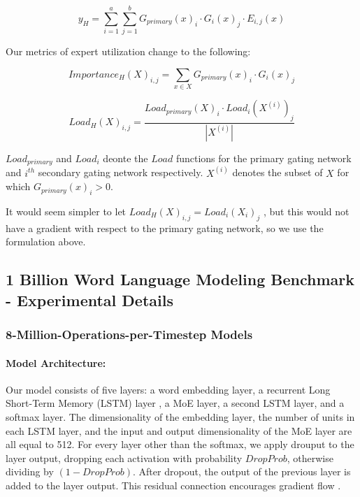 \documentclass{article} %
\begin{document}
\begin{equation}\label{eq:gate_expert}
y_H = \sum_{i=1}^{a}\sum_{j=1}^{b}G_{primary}(x)_i \cdot G_i(x)_j \cdot E_{i,j}(x)
\end{equation}

Our metrics of expert utilization change to the following:

\begin{equation}
Importance_H(X)_{i,j} = \sum_{x \in X}G_{primary}(x)_i \cdot G_i(x)_j
\end{equation}

\begin{equation}
Load_H(X)_{i,j} = \frac{Load_{primary}(X)_i \cdot Load_i(X^{(i)})_j}{|X^{(i)}|}
\end{equation}

$Load_{primary}$ and $Load_i$ deonte the $Load$ functions for the primary gating network and $i^{th}$ secondary gating network respectively.  $X^{(i)}$ denotes the subset of $X$ for which $G_{primary}(x)_i > 0$.  

It would seem simpler to let $Load_H(X)_{i,j} = Load_i(X_i)_j$ , but this would not have a gradient with respect to the primary gating network, so we use the formulation above.



\subsection{1 Billion Word Language Modeling Benchmark - Experimental Details}\label{sec:appendixlm1b}

\subsubsection{8-Million-Operations-per-Timestep Models}

\paragraph{Model Architecture:}  Our model consists of five layers: a word embedding layer, a recurrent Long Short-Term Memory (LSTM) layer \citep{Hochreiter:1997:LSM,Gers:2000:LFC}, a MoE layer, a second LSTM layer, and a softmax layer.  The dimensionality of the embedding layer, the number of units in each LSTM layer, and the input and output dimensionality of the MoE layer are all equal to 512.  For every layer other than the softmax, we apply drouput \citep{ZarembaSV14} to the layer output, dropping each activation with probability $DropProb$, otherwise dividing by $(1-DropProb)$.  After dropout, the output of the previous layer is added to the layer output. This residual connection encourages gradient flow \citep{HeZRS:2015:DRL}.
\end{document}
